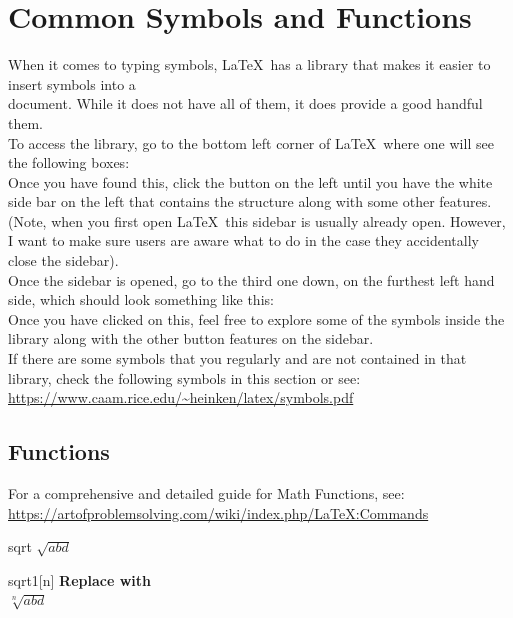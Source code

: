 \section{Common Symbols and Functions}
\vspace{10.5cm}
When it comes to typing symbols, \LaTeX\ has a library that makes it easier to insert symbols into a\\ document. While it does not have all of them, it does provide a good handful them.\\
To access the library, go to the bottom left corner of \LaTeX\ where one will see the following boxes:\\	
Once you have found this, click the button on the left until you have the white side bar on the left that contains the structure along with some other features. (Note, when you first open \LaTeX\ this sidebar is usually already open. However, I want to make sure users are aware what to do in the case they accidentally close the sidebar).\\
Once the sidebar is opened, go to the third one down, on the furthest left hand side, which should look something like this:\\
Once you have clicked on this, feel free to explore some of the symbols inside the library along with the other button features on the sidebar.\\ 
If there are some symbols that you regularly and are not contained in that library, check the following symbols in this section or see: \url{https://www.caam.rice.edu/~heinken/latex/symbols.pdf}
	\subsection{Functions}
	For a comprehensive and detailed guide for Math Functions, see:\\ \url{https://artofproblemsolving.com/wiki/index.php/LaTeX:Commands}
		\begin{docCommand}{sqrt}{}
			$\sqrt{abd}$
		\end{docCommand}
		\begin{docCommand}{sqrt1}{[n]}
		    \textbf{Replace  with }\\
			$\sqrt[n]{abd}$
		\end{docCommand}

